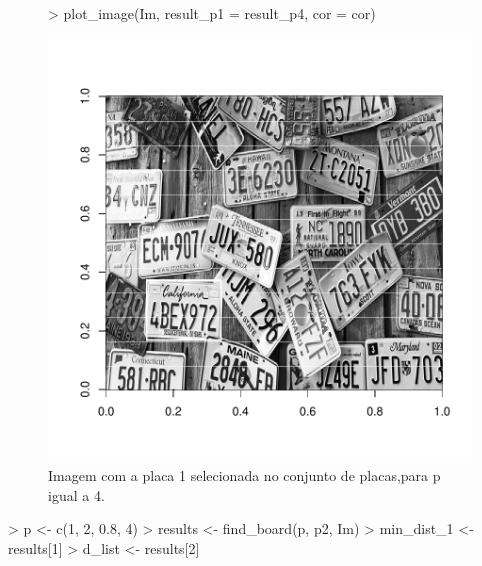 \documentclass[12pt]{article}
\begin{document}
\begin{figure}
\centering
\begin{Schunk}
\begin{Sinput}
> plot_image(Im, result_p1 = result_p4, cor = cor)
\end{Sinput}
\end{Schunk}
\includegraphics{template_matching-015}
\caption{Imagem com a placa 1 selecionada no conjunto de placas,para p igual a 4.}
\label{placa1selecionada}
\end{figure}


\begin{Schunk}
\begin{Sinput}
> p <- c(1, 2, 0.8, 4)
> results <- find_board(p, p2, Im)
> min_dist_1 <- results[1]
> d_list <- results[2]
\end{Sinput}
\end{Schunk}
\end{document}
